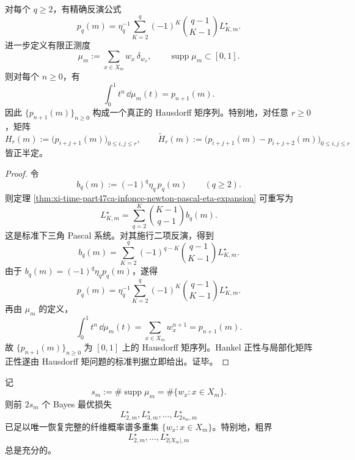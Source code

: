 \begin{theorem}\label{thm:xi-time-part47ca-infonce-signed-hausdorff-inversion}
对每个 \(q\ge 2\)，有精确反演公式
\[
p_q(m)
=
\eta_q^{-1}
\sum_{K=2}^{q}(-1)^K\binom{q-1}{K-1}L_{K,m}^{\star}.
\]
进一步定义有限正测度
\[
\mu_m:=\sum_{x\in X_m} w_x\,\delta_{w_x},
\qquad
\operatorname{supp}\mu_m\subset[0,1].
\]
则对每个 \(n\ge 0\)，有
\[
\int_0^1 t^n\,\dd\mu_m(t)=p_{n+1}(m).
\]
因此 \(\{p_{n+1}(m)\}_{n\ge 0}\) 构成一个真正的 Hausdorff 矩序列。特别地，对任意 \(r\ge 0\)，矩阵
\[
H_r(m):=\bigl(p_{i+j+1}(m)\bigr)_{0\le i,j\le r},
\qquad
\widetilde H_r(m):=\bigl(p_{i+j+1}(m)-p_{i+j+2}(m)\bigr)_{0\le i,j\le r}
\]
皆正半定。
\end{theorem}

\begin{proof}
令
\[
b_q(m):=(-1)^q\eta_q\,p_q(m)\qquad(q\ge 2).
\]
则定理 \ref{thm:xi-time-part47ca-infonce-newton-pascal-eta-expansion} 可重写为
\[
L_{K,m}^{\star}
=
\sum_{q=2}^{K}\binom{K-1}{q-1}b_q(m).
\]
这是标准下三角 Pascal 系统。对其施行二项反演，得到
\[
b_q(m)
=
\sum_{K=2}^{q}(-1)^{q-K}\binom{q-1}{K-1}L_{K,m}^{\star}.
\]
由于 \(b_q(m)=(-1)^q\eta_q p_q(m)\)，遂得
\[
p_q(m)
=
\eta_q^{-1}
\sum_{K=2}^{q}(-1)^K\binom{q-1}{K-1}L_{K,m}^{\star}.
\]
再由 \(\mu_m\) 的定义，
\[
\int_0^1 t^n\,\dd\mu_m(t)
=
\sum_{x\in X_m}w_x^{n+1}
=
p_{n+1}(m).
\]
故 \(\{p_{n+1}(m)\}_{n\ge 0}\) 为 \([0,1]\) 上的 Hausdorff 矩序列。Hankel 正性与局部化矩阵正性遂由 Hausdorff 矩问题的标准判据立即给出。证毕。
\end{proof}

\begin{theorem}\label{thm:xi-time-part47ca-infonce-prony-fiber-spectrum-bound}
记
\[
s_m:=\#\operatorname{supp}\mu_m=\#\{w_x:x\in X_m\}.
\]
则前 \(2s_m\) 个 Bayes 最优损失
\[
L_{2,m}^{\star},L_{3,m}^{\star},\dots,L_{2s_m,m}^{\star}
\]
已足以唯一恢复完整的纤维概率谱多重集 \(\{w_x:x\in X_m\}\)。特别地，粗界
\[
L_{2,m}^{\star},\dots,L_{2|X_m|,m}^{\star}
\]
总是充分的。
\end{theorem}

